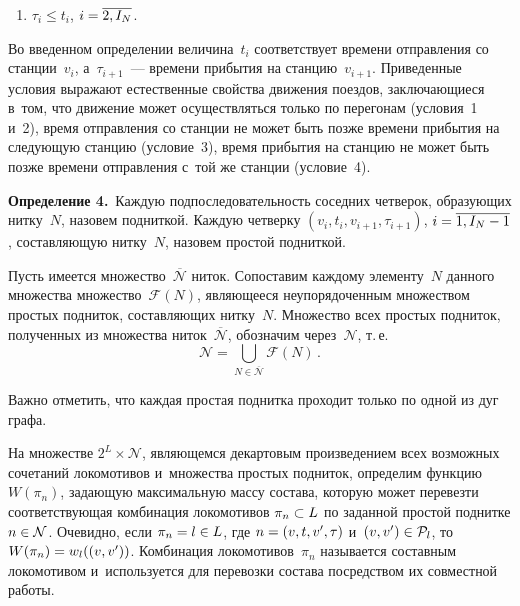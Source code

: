 \begin{multicols}{2}
\begin{enumerate}[(1)]
    \item
        $\tau_{i} \leqslant t_{i} $, $i \hm= \overline{2,I_N}$.
        
    \end{enumerate}



Во введенном определении величина~$t_i$ соответствует времени отправления со
 станции~$v_i$, а~$\tau_{i+1}$~--- времени прибытия на станцию~$v_{i+1}$. 
 Приведенные условия выражают естественные свойства движения поездов, 
 заключающиеся в~том, что движение может осуществляться только по 
 перегонам (условия~1 и~2), время отправления со станции не может быть 
 позже времени прибытия на следующую станцию (условие~3), время прибытия 
 на станцию не может быть позже времени отправления с~той же станции (условие~4).

\smallskip

\noindent
\textbf{Определение 4.}\
    Каждую подпоследовательность соседних четверок, образующих нитку~$N$, 
    назовем подниткой. Каждую четверку $(v_i, t_i, v_{i+1}, \tau_{i+1})$, 
    $i\hm=\overline{1, I_N-1}$, составляющую нитку~$N$, назовем прос\-той подниткой.

\smallskip

Пусть имеется множество~$\overline{\mathcal N}$ ниток. Сопоставим каждому элементу~$N$ 
данного множества множество~$\mathcal F(N)$,  являющееся неупорядоченным множеством 
простых подниток, составляющих нитку~$N$. Множество всех простых подниток, 
полученных из множества ниток~$\overline {\mathcal N}$, обозначим через~$\mathcal N$, 
т.\,е.\
\begin{equation*}
        \mathcal N = \bigcup_{N\in \overline{\mathcal N}} \mathcal F(N)\,.
\end{equation*}

Важно отметить, что каждая простая поднитка проходит только по одной из дуг графа.
    
На множестве $2^L\times \mathcal N$, являющемся декартовым 
произведением всех возможных сочетаний локомотивов и~множества 
простых подниток, определим функцию~$W(\pi_n)$, задающую максимальную массу 
состава, которую может перевезти со\-от\-вет\-ст\-ву\-ющая комбинация локомотивов $\pi_n 
\hm\subset L$ по заданной простой поднитке $n \hm\in \mathcal N$. Очевидно, 
если $\pi_n\hm = l \hm\in L$, где $n \hm= (v,t,v',\tau)$ 
и~$(v,v')\hm\in \mathcal P_l$, то $W(\pi_n) \hm= w_l((v, v'))$. 
Комбинация локомотивов~$\pi_n$ называется составным локомотивом и~используется 
для перевозки состава посредством их совместной работы.
    

\end{multicols}
